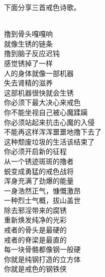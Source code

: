 下面分享三首戒色诗歌。

\begin{poem}[戒色除锈行动]
    \begin{multicols}{2}
        \begin{center}~\\
            撸到骨头嘎嘎响 \\ 就像生锈的链条 \\ 撸到脑子反应迟钝 \\ 感觉锈掉了一样 \\ 人的身体就像一部机器 \\ 失去肾精的滋养 \\ 这部机器很快就会生锈 \\ 你必须下最大决心来戒色 \\ 你不能坐视自己被心魔蹂躏 \\ 你必须站起来抗击心魔的入侵 \\ 不能再这样浑浑噩噩地撸下去了 \\ 这种颓废垃圾的生活该结束了 \\ 你必须开启新的征程 \\ 从一个锈迹斑斑的撸者 \\ 蜕变成勇猛的戒色战将 \\ 浑身充满了劲爆的能量 \\ 一身浩然正气，慷慨激昂 \\ 一种烈士气概，拔山盖世 \\ 除去邪淫带来的腐锈 \\ 重新焕发纯净的光彩 \\ 戒者的骨头是最硬的 \\ 戒者的脊梁是最直的 \\ 每一块骨骼都像钢一般硬 \\ 你就是纯钢打造的立方体 \\ 你就是戒色的钢铁侠
        \end{center}
    \end{multicols}
\end{poem}

